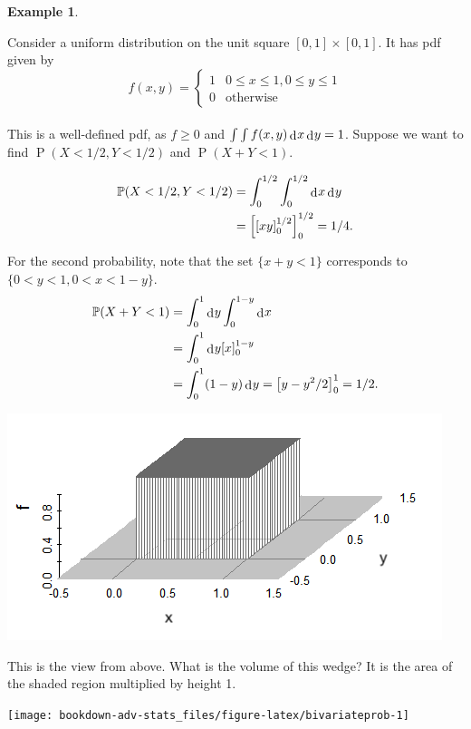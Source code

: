 \documentclass[
]{book}
\DeclareMathOperator{\Prob}{P}
\newcommand{\bbP}{\mathbb{P}}
\DeclareMathOperator{\dd}{d}
\newcommand{\dint}{\dd\hspace{0.5pt}\!}
\theoremstyle{definition}
\theoremstyle{definition}
\newtheorem{example}{Example}[chapter]
\theoremstyle{definition}
\theoremstyle{definition}
\theoremstyle{remark}
\begin{document}
\begin{example}
\protect\hypertarget{exm:unitsquare}{}\label{exm:unitsquare}

Consider a uniform distribution on the unit square \([0,1] \times [0,1]\). It has pdf given by
\[
f(x,y) = \begin{cases}
  1 &0\leq x \leq 1, 0\leq y \leq 1 \\
  0 &\text{otherwise}
\end{cases}
\]\\
This is a well-defined pdf, as \(f\geq 0\) and \(\int\int f(x,y)\dint x \dint y = 1\).
Suppose we want to find \(\Prob(X<1/2, Y<1/2)\) and \(\Prob(X + Y < 1)\).

\begin{align*}
\bbP(X<1/2, Y<1/2) &= \int_0^{1/2} \int_0^{1/2} \dint x \dint y \\
&= \left[ \left[ xy \right]_{0}^{1/2} \right]_{0}^{1/2} = 1/4.
\end{align*}

For the second probability, note that the set \(\{x+y<1\}\) corresponds to \(\{0<y<1, 0<x < 1-y\}\).
\begin{align*}
  \bbP(X+Y<1) &= \int_0^{1} \dint y \int_0^{1-y}  \dint x \\
  &= \int_0^{1} \dint y [x]_0^{1-y} \\
  &= \int_0^{1} (1-y) \dint y = \big[y - y^2/2\big]_0^1 = 1/2.
\end{align*}

\begin{center}\includegraphics[width=0.8\linewidth]{figure/bivariateunif} \end{center}

This is the view from above. What is the volume of this wedge? It is the area of the shaded region multiplied by height 1.

\begin{center}\texttt{[image: bookdown-adv-stats\_files/figure-latex/bivariateprob-1]} \end{center}

\end{example}
\end{document}
